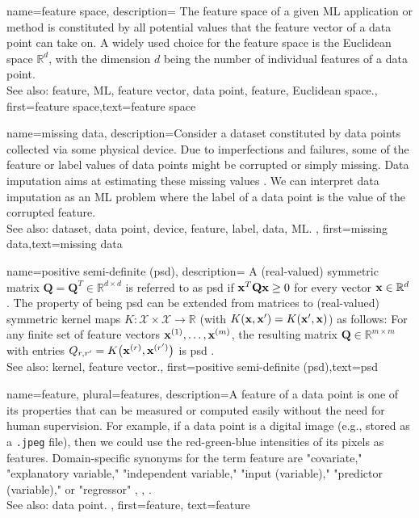 {name={feature space},
	description={
		The feature space of a given ML application or method is 
		constituted by all potential values that the feature vector of a data point can 
		take on. A widely used choice for the feature space is the Euclidean space $\mathbb{R}^{d}$, 
		with the dimension $d$ being the number of individual features of a data point.
				\\
		See also: feature, ML, feature vector, data point, feature, Euclidean space.},
	first={feature space},text={feature space}  
}


{name={missing data},
	description={Consider a dataset constituted by data points collected via 
		some physical device. Due to imperfections and failures, some of the feature 
		or label values of data points might be corrupted or simply missing. 
		Data imputation aims at estimating these missing values \cite{Abayomi2008DiagnosticsFM}. 
		We can interpret data imputation as an ML problem where the label of a data point is 
		the value of the corrupted feature.
				\\
		See also: dataset, data point, device, feature, label, data, ML. },
	first={missing data},text={missing data}  
}


{name={positive semi-definite (psd)},
	description=
	{A (real-valued) symmetric matrix $\mathbf{Q} = \mathbf{Q}^{T} \in \mathbb{R}^{d \times d}$ 
	 is referred to as psd if ${\bf x}^{T} \mathbf{Q} {\bf x} \geq 0$ for every vector ${\bf x} \in \mathbb{R}^{d}$. 
	 The property of being psd can be extended from matrices to (real-valued) 
	 symmetric kernel maps $K: \mathcal{X} \times \mathcal{X} \rightarrow \mathbb{R}$ 
	 (with $K({\bf x},{\bf x}') = K({\bf x}',{\bf x})$)
	 as follows: For any finite set of feature vectors ${\bf x}^{(1)},\dots,{\bf x}^{(m)}$, 
	 the resulting matrix $\mathbf{Q} \in \mathbb{R}^{m \times m}$ with 
	entries $Q_{r,r'} = K\big({\bf x}^{(r)},{\bf x}^{(r')}\big)$ 
	is psd \cite{LearningKernelsBook}.
			\\
		See also: kernel, feature vector.},
	first={positive semi-definite (psd)},text={psd}  
}

{name={feature}, plural={features},
	description={A feature of a data point is one of its properties that can be 
		measured or computed easily without the need for human supervision. For example, if a data point 
		is a digital image (e.g., stored as a \texttt{.jpeg} file), then we could use the red-green-blue intensities 
		of its pixels as features. Domain-specific synonyms for the term feature are "covariate," "explanatory variable," 
		"independent variable," "input (variable)," "predictor (variable)," or "regressor" \cite{Gujarati2021}, \cite{Dodge2003}, \cite{Everitt2022}. 
				\\
		See also: data point.
		}, first={feature},
		text={feature}  
}

